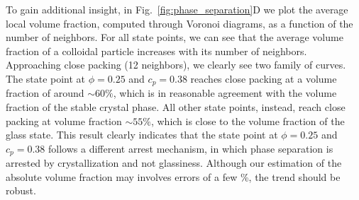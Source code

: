 \documentclass[12pt]{article}
\begin{document}
To gain additional insight, in Fig.~\ref{fig:phase_separation}D we plot the average local volume fraction, computed
through Voronoi diagrams, as a function of the number of neighbors. For all state points, we can see that the average volume fraction of a colloidal
particle increases with its number of neighbors. Approaching close packing (12 neighbors), we clearly see two family of curves. The state point
at $\phi=0.25$ and $c_p=0.38$ reaches close packing at a volume fraction of around $\sim 60\%$, which is in reasonable agreement with the
volume fraction of the stable crystal phase. All other state points, instead, reach close packing at volume fraction $\sim 55\%$, which is
close to the volume fraction of the glass state. 
This result clearly indicates that the state point at $\phi=0.25$ and $c_p=0.38$ follows a different arrest mechanism, in which phase separation
is arrested by crystallization and not glassiness. Although our estimation of the absolute volume fraction may involves errors of a few \%, the trend should be robust.


% 

% 
% 
\end{document}

